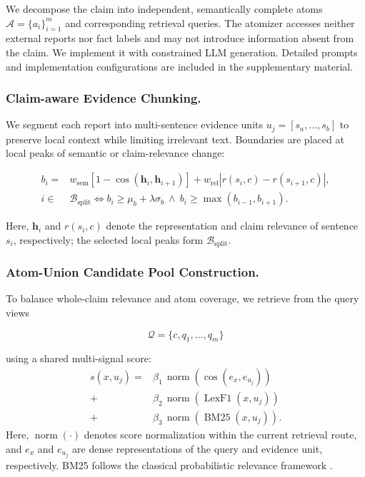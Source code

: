 \documentclass[letterpaper]{article}
\begin{document}
We decompose the claim into independent, semantically complete atoms
$\mathcal A=\{a_i\}_{i=1}^{m}$ and corresponding retrieval queries.
The atomizer accesses neither external reports nor fact labels and may
not introduce information absent from the claim. We implement it with
constrained LLM generation. Detailed prompts and implementation configurations are included in the
supplementary material.

\subsubsection{Claim-aware Evidence Chunking.}

We segment each report into multi-sentence evidence units
$u_j=[s_a,\ldots,s_b]$ to preserve local context while limiting
irrelevant text. Boundaries are placed at local peaks of semantic or
claim-relevance change:

\[
\begin{aligned}
    b_i={}&w_{\mathrm{sem}}
    \left[1-\cos(\mathbf h_i,\mathbf h_{i+1})\right]
    +w_{\mathrm{rel}}
    \left|r(s_i,c)-r(s_{i+1},c)\right|,\\
    i\in&\mathcal B_{\mathrm{split}}
    \iff{} b_i\ge \mu_b+\lambda\sigma_b
    \ \land\
    b_i\ge\max(b_{i-1},b_{i+1}).
\end{aligned}
\]

Here, $\mathbf h_i$ and $r(s_i,c)$ denote the representation and
claim relevance of sentence $s_i$, respectively; the selected local
peaks form $\mathcal B_{\mathrm{split}}$.

\subsubsection{Atom-Union Candidate Pool Construction.}

To balance whole-claim relevance and atom coverage, we retrieve from
the query views

\[
\mathcal Q=\{c,q_1,\ldots,q_m\}
\]

using a shared multi-signal score:
\[
\begin{aligned}
s(x,u_j)
={}&\beta_1\,\operatorname{norm}\!\left(\cos(e_x,e_{u_j})\right)\\
+&\beta_2\,\operatorname{norm}\!\left(\operatorname{LexF1}(x,u_j)\right)\\
+&\beta_3\,\operatorname{norm}\!\left(\operatorname{BM25}(x,u_j)\right).
\end{aligned}
\]
Here, $\operatorname{norm}(\cdot)$ denotes score normalization within the current retrieval route, and $e_x$ and $e_{u_j}$ are dense representations of the query and evidence unit, respectively. BM25 follows the classical probabilistic relevance framework \citep{Robertson2009BM25}.
\end{document}
